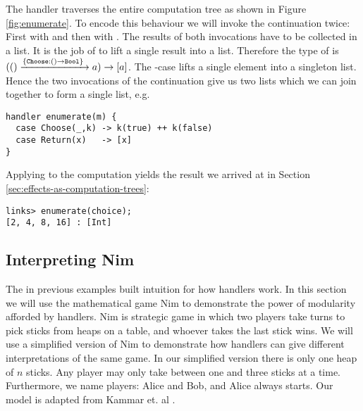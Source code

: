 \begin{example}\label{ex:enumerate}
The handler  traverses the entire computation tree as shown in Figure \ref{fig:enumerate}. To encode this behaviour we will invoke the continuation twice: First with  and then with . The results of both invocations have to be collected in a list. It is the job of  to lift a single result into a list. Therefore the type of  is 
$(() \xrightarrow{\{\texttt{Choose}:() \to \texttt{Bool}\}\;} a) \to [a]$.
The -case lifts a single element into a singleton list. Hence the two invocations of the continuation give us two lists which we can join together to form a single list, e.g.
\begin{lstlisting}[style=links]
handler enumerate(m) {
  case Choose(_,k) -> k(true) ++ k(false)
  case Return(x)   -> [x]
}
\end{lstlisting}
Applying  to the computation  yields the result we arrived at in Section \ref{sec:effects-as-computation-trees}:
\begin{lstlisting}[style=links]
links> enumerate(choice);
[2, 4, 8, 16] : [Int]
\end{lstlisting}
\end{example}

\subsection{Interpreting Nim}\label{sec:interpreting-nim}
The in previous examples built intuition for how handlers work. In this section we will use the mathematical game Nim to demonstrate the power of modularity afforded by handlers. Nim is strategic game in which two players take turns to pick sticks from heaps on a table, and whoever takes the last stick wins.
We will use a simplified version of Nim to demonstrate how handlers can give different interpretations of the same game. In our simplified version there is only one heap of $n$ sticks. Any player may only take between one and three sticks at a time. Furthermore, we name players: Alice and Bob, and Alice always starts. Our model is adapted from Kammar et. al \cite{Kammar2013}.

